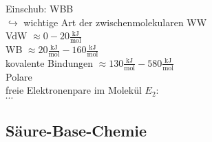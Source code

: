 \documentclass{article}
\begin{document}
Einschub: WBB\\
$\hookrightarrow $ wichtige Art der zwischenmolekularen WW\\
VdW $\approx 0-20 \mathrm{\frac{kJ}{mol}}$\\
WB $\approx 20 \mathrm{\frac{kJ}{mol}} - 160\mathrm{\frac{kJ}{mol}}$\\
kovalente Bindungen $\approx 130 \mathrm{\frac{kJ}{mol}} - 580 \mathrm{\frac{kJ}{mol}}$\\
Polare \\
freie Elektronenpare im Molekül $E_2$:\\
 $\cdots$ 

\subsection{Säure-Base-Chemie}
\end{document}
